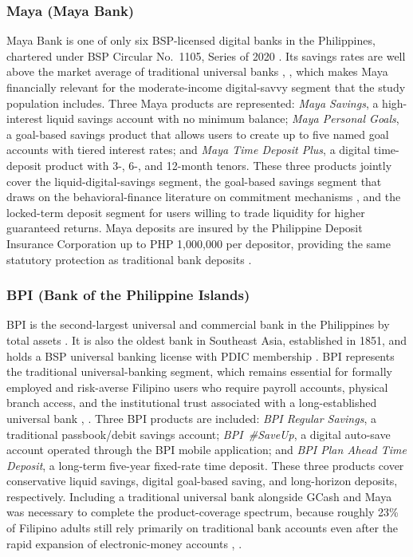 \documentclass[journal]{./IEEE/IEEEtran}
\begin{document}
\subsubsection{Maya (Maya Bank)}
Maya Bank is one of only six BSP-licensed digital banks in the Philippines, chartered under BSP Circular No.~1105, Series of 2020 \cite{ref36}. Its savings rates are well above the market average of traditional universal banks \cite{ref35}, \cite{ref9}, which makes Maya financially relevant for the moderate-income digital-savvy segment that the study population includes. Three Maya products are represented: \emph{Maya Savings}, a high-interest liquid savings account with no minimum balance; \emph{Maya Personal Goals}, a goal-based savings product that allows users to create up to five named goal accounts with tiered interest rates; and \emph{Maya Time Deposit Plus}, a digital time-deposit product with 3-, 6-, and 12-month tenors. These three products jointly cover the liquid-digital-savings segment, the goal-based savings segment that draws on the behavioral-finance literature on commitment mechanisms \cite{ref63}, and the locked-term deposit segment for users willing to trade liquidity for higher guaranteed returns. Maya deposits are insured by the Philippine Deposit Insurance Corporation up to PHP 1,000,000 per depositor, providing the same statutory protection as traditional bank deposits \cite{ref36}.

\subsubsection{BPI (Bank of the Philippine Islands)}
BPI is the second-largest universal and commercial bank in the Philippines by total assets \cite{ref37}. It is also the oldest bank in Southeast Asia, established in 1851, and holds a BSP universal banking license with PDIC membership \cite{ref37}. BPI represents the traditional universal-banking segment, which remains essential for formally employed and risk-averse Filipino users who require payroll accounts, physical branch access, and the institutional trust associated with a long-established universal bank \cite{ref35}, \cite{ref37}. Three BPI products are included: \emph{BPI Regular Savings}, a traditional passbook/debit savings account; \emph{BPI~\#SaveUp}, a digital auto-save account operated through the BPI mobile application; and \emph{BPI Plan Ahead Time Deposit}, a long-term five-year fixed-rate time deposit. These three products cover conservative liquid savings, digital goal-based saving, and long-horizon deposits, respectively. Including a traditional universal bank alongside GCash and Maya was necessary to complete the product-coverage spectrum, because roughly 23\% of Filipino adults still rely primarily on traditional bank accounts even after the rapid expansion of electronic-money accounts \cite{ref35}, \cite{ref66}.
\end{document}
